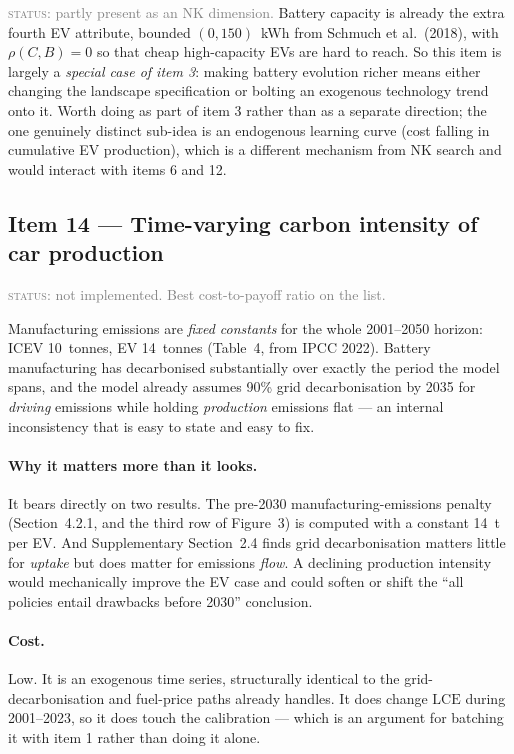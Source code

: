 \documentclass[11pt]{article}
\newcommand{\status}[1]{\textcolor{gray}{\textsc{status:} #1}}
\begin{document}
\status{partly present as an NK dimension.} Battery capacity is already the
extra fourth EV attribute, bounded $(0, 150)$~kWh from Schmuch et al.\
(2018), with $\rho(C,B)=0$ so that cheap high-capacity EVs are hard to
reach. So this item is largely a \emph{special case of item 3}: making
battery evolution richer means either changing the landscape specification
or bolting an exogenous technology trend onto it. Worth doing as part of
item 3 rather than as a separate direction; the one genuinely distinct
sub-idea is an endogenous learning curve (cost falling in cumulative EV
production), which is a different mechanism from NK search and would
interact with items 6 and 12.

\subsection{Item 14 --- Time-varying carbon intensity of car production}

\status{not implemented. Best cost-to-payoff ratio on the list.}

Manufacturing emissions are \emph{fixed constants} for the whole
2001--2050 horizon: ICEV 10~tonnes, EV 14~tonnes (Table~4, from IPCC 2022).
Battery manufacturing has decarbonised substantially over exactly the period
the model spans, and the model already assumes 90\% grid decarbonisation by
2035 for \emph{driving} emissions while holding \emph{production} emissions
flat --- an internal inconsistency that is easy to state and easy to fix.

\paragraph{Why it matters more than it looks.} It bears directly on two
results. The pre-2030 manufacturing-emissions penalty (Section~4.2.1, and
the third row of Figure~3) is computed with a constant 14~t per EV. And
Supplementary Section~2.4 finds grid decarbonisation matters little for
\emph{uptake} but does matter for emissions \emph{flow}. A declining
production intensity would mechanically improve the EV case and could soften
or shift the ``all policies entail drawbacks before 2030'' conclusion.

\paragraph{Cost.} Low. It is an exogenous time series, structurally
identical to the grid-decarbonisation and fuel-price paths
 already handles. It does change $\mathrm{LCE}$
during 2001--2023, so it does touch the calibration --- which is an argument
for batching it with item 1 rather than doing it alone.
\end{document}
